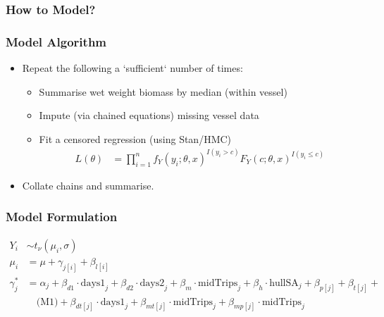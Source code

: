 \documentclass[aspectratio=169]{beamer}
\begin{document}
\begin{frame}
  \frametitle{How to Model?}
\end{frame}

\begin{frame}
  \frametitle{Model Algorithm}
  \begin{itemize}
  \item Repeat the following a `sufficient` number of times:
    \begin{itemize}
    \item Summarise wet weight biomass by median (within vessel)
    \item Impute (via chained equations) missing vessel data
    \item Fit a censored regression (using Stan/HMC)
      \begin{align*}
        L(\theta) & = \prod_{i=1}^{n} f_{Y}(y_{i}; \theta, x)^{I(y_{i} > c)} F_{Y}(c; \theta, x)^{I(y_{i} \leq c)}
      \end{align*}
    \end{itemize}
  \item Collate chains and summarise.
  \end{itemize}
\end{frame}

\begin{frame}
  \frametitle{Model Formulation}
  \begin{align*}
    Y_{i} & \sim t_{\nu}(\mu_{i}, \sigma) \\
    \mu_{i} & = \mu + \gamma_{j[i]} + \beta_{l[i]} \\
    \gamma_{j}^{*} & = \alpha_{j} + \beta_{d1} \cdot \text{days1}_{j} + \beta_{d2} \cdot \text{days2}_{j} + \beta_{m} \cdot \text{midTrips}_{j} + \beta_{h} \cdot \text{hullSA}_{j} + \beta_{p[j]} + \beta_{t[j]} + \\
          & \quad \text{(M1)} + \beta_{dt[j]} \cdot \text{days1}_{j} + \beta_{mt[j]} \cdot \text{midTrips}_{j} + \beta_{mp[j]} \cdot \text{midTrips}_{j}
  \end{align*}
\end{frame}
\end{document}

